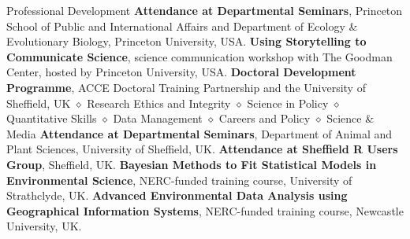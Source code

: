 \begin{rubric}{Professional Development}
 \textbf{Attendance at Departmental Seminars}, Princeton School of Public and International Affairs and Department of Ecology \& Evolutionary Biology, Princeton University, USA.
\entry*[2020] \textbf{Using Storytelling to Communicate Science}, science communication workshop with The Goodman Center, hosted by Princeton University, USA.
\entry*[2014 -- 2018] \textbf{Doctoral Development
Programme}, ACCE Doctoral Training Partnership and the University of Sheffield, UK $\diamond$ Research Ethics and Integrity $\diamond$ Science in Policy $\diamond$ Quantitative Skills $\diamond$ Data Management $\diamond$ Careers and Policy $\diamond$ Science \& Media
\entry*[2014 -- 2018] \textbf{Attendance at Departmental Seminars}, Department of Animal and Plant Sciences, University of Sheffield, UK.
\entry*[2014 -- 2018] \textbf{Attendance at Sheffield R Users Group}, Sheffield, UK.
\entry*[2016] \textbf{Bayesian Methods to Fit Statistical Models in
Environmental Science}, NERC-funded training course, University of Strathclyde, UK.
\entry*[2015] \textbf{Advanced Environmental Data Analysis using
Geographical Information Systems}, NERC-funded training course, Newcastle University, UK.

\end{rubric}
